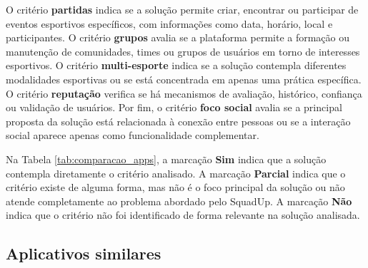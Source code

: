 \documentclass[a4paper, 12pt]{article}
\begin{document}
\begin{justify}
O critério \textbf{partidas} indica se a solução permite criar, encontrar ou participar de eventos esportivos específicos, com informações como data, horário, local e participantes. O critério \textbf{grupos} avalia se a plataforma permite a formação ou manutenção de comunidades, times ou grupos de usuários em torno de interesses esportivos. O critério \textbf{multi-esporte} indica se a solução contempla diferentes modalidades esportivas ou se está concentrada em apenas uma prática específica. O critério \textbf{reputação} verifica se há mecanismos de avaliação, histórico, confiança ou validação de usuários. Por fim, o critério \textbf{foco social} avalia se a principal proposta da solução está relacionada à conexão entre pessoas ou se a interação social aparece apenas como funcionalidade complementar.

Na Tabela \ref{tab:comparacao_apps}, a marcação \textbf{Sim} indica que a solução contempla diretamente o critério analisado. A marcação \textbf{Parcial} indica que o critério existe de alguma forma, mas não é o foco principal da solução ou não atende completamente ao problema abordado pelo SquadUp. A marcação \textbf{Não} indica que o critério não foi identificado de forma relevante na solução analisada.

\begin{table}[H]
\centering
\caption{Comparação entre soluções analisadas}
\label{tab:comparacao_apps}
\end{table}

\subsection{Aplicativos similares}


\end{justify}
\end{document}
